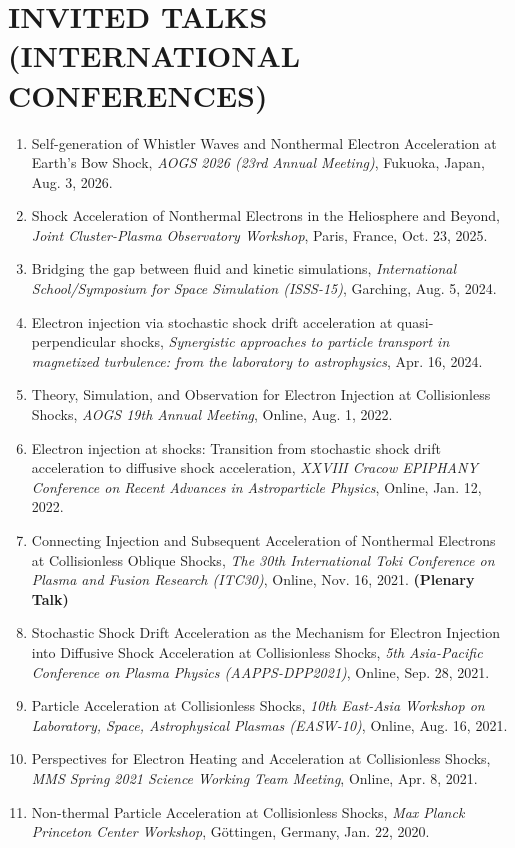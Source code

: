 \documentclass[lualatex,a4paper,ja=standard]{scrartcl}
\newcommand{\NewPart}[2]{\section*{\uppercase{#1} #2}}
\newcommand{\TalkEntry}[3]{
\item #1, \textit{#2}, #3.}
\begin{document}
\newpage
\NewPart{Invited Talks (International Conferences)}{}
\begin{enumerate}
	\TalkEntry
	{Self-generation of Whistler Waves and Nonthermal Electron Acceleration at Earth's Bow Shock}
	{AOGS 2026 (23rd Annual Meeting)}
	{Fukuoka, Japan, Aug. 3, 2026}

	\TalkEntry
	{Shock Acceleration of Nonthermal Electrons in the Heliosphere and Beyond}
	{Joint Cluster-Plasma Observatory Workshop}
	{Paris, France, Oct. 23, 2025}

	\TalkEntry
	{Bridging the gap between fluid and kinetic simulations}
	{International School/Symposium for Space Simulation (ISSS-15)}
	{Garching, Aug. 5, 2024}

	\TalkEntry
	{Electron injection via stochastic shock drift acceleration at quasi-perpendicular shocks}
	{Synergistic approaches to particle transport in magnetized turbulence: from the laboratory to astrophysics}
	{Apr. 16, 2024}

	\TalkEntry
	{Theory, Simulation, and Observation for Electron Injection at Collisionless Shocks}
	{AOGS 19th Annual Meeting}
	{Online, Aug. 1, 2022}

	\TalkEntry
	{Electron injection at shocks: Transition from stochastic shock drift acceleration to diffusive shock acceleration}
	{XXVIII Cracow EPIPHANY Conference on Recent Advances in Astroparticle Physics}
	{Online, Jan. 12, 2022}

	\TalkEntry
	{Connecting Injection and Subsequent Acceleration of Nonthermal Electrons at Collisionless Oblique Shocks}
	{The 30th International Toki Conference on Plasma and Fusion Research (ITC30)}
	{Online, Nov. 16, 2021} \textbf{(Plenary Talk)}

	\TalkEntry
	{Stochastic Shock Drift Acceleration as the Mechanism for Electron Injection into Diffusive Shock Acceleration at Collisionless Shocks}
	{5th Asia-Pacific Conference on Plasma Physics (AAPPS-DPP2021)}
	{Online, Sep. 28, 2021}

	\TalkEntry
	{Particle Acceleration at Collisionless Shocks}
	{10th East-Asia Workshop on Laboratory, Space, Astrophysical Plasmas (EASW-10)}
	{Online, Aug. 16, 2021}

	\TalkEntry
	{Perspectives for Electron Heating and Acceleration at Collisionless Shocks}
	{MMS Spring 2021 Science Working Team Meeting}
	{Online, Apr. 8, 2021}

	\TalkEntry
	{Non-thermal Particle Acceleration at Collisionless Shocks}
	{Max Planck Princeton Center Workshop}
	{G\"ottingen, Germany, Jan. 22, 2020}


\end{enumerate}
\end{document}
